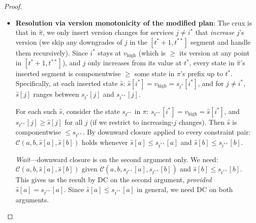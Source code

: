 \documentclass[10pt,twocolumn]{article}
\begin{document}
\begin{proof}
\begin{itemize}
Now we need $\mathcal{C}(i^*,j,v_{\mathrm{high}},\hat{s}[j])$. Downward closure only gives us information about decreasing the \emph{second} argument. For the first argument, we need a separate property.

\emph{Key observation}: We apply downward closure \emph{symmetrically}. The dependency relation $\mathit{Deps}$ contains both $(i^*,j)$ and $(j,i^*)$ when $i^*$ and $j$ are mutually dependent. For the constraint $\mathcal{C}(j,i^*,\hat{s}[j],v_{\mathrm{high}})$: since $\mathcal{C}(j,i^*,\hat{s}[j],s_{t'}[i^*])$ holds at step $t'$, and $v_{\mathrm{high}} \geq s_{t'}[i^*]$, we \emph{cannot} apply DC (it gives the downward direction). However, the constraint $\mathcal{C}(j,i^*,\hat{s}[j],v_{\mathrm{high}})$ was already satisfied at step $t^*$ of $\pi$ (when $i^*$ was at $v_{\mathrm{high}}$) as long as $\hat{s}[j]$ was $j$'s version at step $t^*$ or earlier.

\item \textbf{Resolution via version monotonicity of the modified plan}: The crux is that in $\hat{\pi}$, we only insert version changes for services $j \neq i^*$ that \emph{increase} $j$'s version (we skip any downgrades of $j$ in the $[t^*+1, t^{**}]$ segment and handle them recursively). Since $i^*$ stays at $v_{\mathrm{high}}$ (which is $\geq$ its version at any point in $[t^*+1, t^{**}]$), and $j$ only increases from its value at $t^*$, every state in $\hat{\pi}$'s inserted segment is componentwise $\geq$ some state in $\pi$'s prefix up to $t^*$. Specifically, at each inserted state $\hat{s}$: $\hat{s}[i^*] = v_{\mathrm{high}} = s_{t^*}[i^*]$, and for $j \neq i^*$, $\hat{s}[j]$ ranges between $s_{t^*}[j]$ and $s_{t^{**}}[j]$.

For each such $\hat{s}$, consider the state $s_{t^{**}}$ in $\pi$: $s_{t^{**}}[i^*] = v_{\mathrm{high}} = \hat{s}[i^*]$, and $s_{t^{**}}[j] \geq \hat{s}[j]$ for all $j$ (if we restrict to increasing-$j$ changes). Then $\hat{s}$ is componentwise $\leq s_{t^{**}}$. By downward closure applied to every constraint pair: $\mathcal{C}(a,b,\hat{s}[a],\hat{s}[b])$ holds whenever $\hat{s}[a] \leq s_{t^{**}}[a]$ and $\hat{s}[b] \leq s_{t^{**}}[b]$.

\emph{Wait}---downward closure is on the second argument only. We need: $\mathcal{C}(a,b,\hat{s}[a],\hat{s}[b])$ given $\mathcal{C}(a,b,s_{t^{**}}[a], s_{t^{**}}[b])$ and $\hat{s}[b] \leq s_{t^{**}}[b]$. This gives us the result by DC on the second argument, \emph{provided} $\hat{s}[a] = s_{t^{**}}[a]$. Since $\hat{s}[a] \leq s_{t^{**}}[a]$ in general, we need DC on both arguments.
\end{itemize}


\end{proof}
\end{document}
